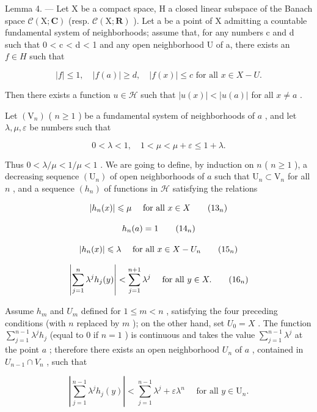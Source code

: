 Lemma 4. --- Let X be a compact space, H a closed linear subspace of the Banach space \(\mathcal{C}(\mathrm{X};\mathbf{C})\) (resp. \(\mathcal{C}(\mathrm{X};\mathbf{R})\) ). Let a be a point of X admitting a countable fundamental system of neighborhoods; assume that, for any numbers c and d such that 0 < c < d < 1 and any open neighborhood U of a, there exists an \(f \in H\) such that

\[
| f | \leqslant 1, \quad | f (a) | \geqslant d, \quad | f (x) | \leqslant c \text {   for   all   } x \in X - U.\tag{12}
\]

Then there exists a function \(u \in \mathcal{H}\) such that \(|u(x)| < |u(a)|\) for all \(x \neq a\) .

Let \(\left(\mathrm{V}_{n}\right)\) ( \(n \geqslant 1\) ) be a fundamental system of neighborhoods of \(a\) , and let \(\lambda, \mu, \varepsilon\) be numbers such that

\[
0 <   \lambda <   1, \quad 1 <   \mu <   \mu + \varepsilon \leqslant 1 + \lambda .
\]

Thus \(0 < \lambda / \mu < 1 / \mu < 1\) . We are going to define, by induction on \(n\) ( \(n \geqslant 1\) ), a decreasing sequence \((\mathrm{U}_n)\) of open neighborhoods of \(a\) such that \(\mathrm{U}_n \subset \mathrm{V}_n\) for all \(n\) , and a sequence \((h_n)\) of functions in \(\mathcal{H}\) satisfying the relations

\[
\left| h _ {n} (x) \right| \leqslant \mu \quad \text { for   all } x \in X\tag{\ensuremath{13_n}}
\]

\[
h _ {n} (a) = 1\tag{\ensuremath{14_n}}
\]

\[
\left| h _ {n} (x) \right| \leqslant \lambda \quad \text { for   all } x \in X - U _ {n}\tag{\ensuremath{15_n}}
\]

\[
\left| \sum_ {j = 1} ^ {n} \lambda^ {j} h _ {j} (y) \right| <   \sum_ {j = 1} ^ {n + 1} \lambda^ {j} \quad \text { for   all } y \in X.\tag{\ensuremath{16_n}}
\]

Assume \(h_m\) and \(U_m\) defined for \(1 \leqslant m < n\) , satisfying the four preceding conditions (with \(n\) replaced by \(m\) ); on the other hand, set \(U_0 = X\) . The function \(\sum_{j=1}^{n-1} \lambda^j h_j\) (equal to 0 if \(n = 1\) ) is continuous and takes the value \(\sum_{j=1}^{n-1} \lambda^j\) at the point \(a\) ; therefore there exists an open neighborhood \(U_n\) of \(a\) , contained in \(U_{n-1} \cap V_n\) , such that

\[
\left| \sum_ {j = 1} ^ {n - 1} \lambda^ {j} h _ {j} (y) \right| <   \sum_ {j = 1} ^ {n - 1} \lambda^ {j} + \varepsilon \lambda^ {n} \quad \text { for   all } y \in \mathrm{U} _ {n}.\tag{17}
\]

